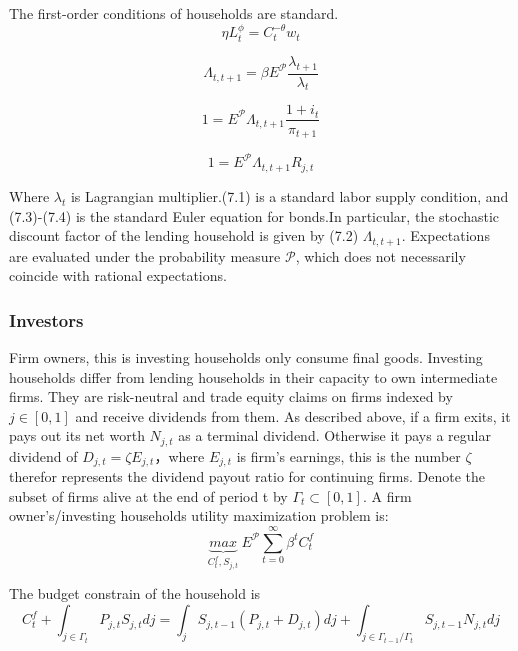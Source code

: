 \documentclass[10pt,math=newtx,citestyle=gb7714-2015,bibstyle=gb7714-2015]{elegantbook}
\begin{document}
{{{	
	The first-order conditions of households are standard. 
	\begin{equation}
		\eta L_t^{\phi}=C_t^{-\theta}w_t
	\end{equation}
	
	\begin{equation}
		\Lambda_{t,t+1}=\beta\mathit{E}^{\mathcal{P}}\frac{\lambda_{t+1}}{\lambda_t}
	\end{equation}
	
	\begin{equation}
		1=\mathit{E}^{\mathcal{P}}\Lambda_{t,t+1}\frac{1+i_t}{\pi_{t+1}}
	\end{equation}
	
	\begin{equation}
		1=\mathit{E}^{\mathcal{P}}\Lambda_{t,t+1}R_{j,t}
	\end{equation}
	
	Where $\lambda_t$ is Lagrangian multiplier.(7.1) is a standard labor supply condition, and (7.3)-(7.4) is the standard Euler equation for bonds.In particular, the stochastic discount factor of the lending household is given by (7.2) $\Lambda_{t,t+1}$. Expectations are evaluated under the probability measure $\mathcal{P}$, which does not necessarily coincide with rational expectations.
	
	\subsubsection{Investors}
	Firm owners, this is investing households only consume final goods. Investing households differ from lending households in their capacity to own intermediate firms. They are risk-neutral and trade equity claims on firms indexed by $j \in [0, 1]$ and receive dividends from them. As described above, if a firm exits, it pays out its net worth $N_{j,t}$ as a terminal dividend. Otherwise it pays a regular dividend of $D_{j,t}=\zeta E_{j,t}$，where $E_{j,t}$ is firm's earnings, this is the number $\zeta$ therefor represents the dividend payout ratio for continuing firms. Denote the subset of firms alive at the end of period t by $\varGamma_t \subset [0, 1]$. A firm owner’s/investing households utility maximization problem is:
	\begin{equation*}
		\underbrace{max}_{C_t^f,S_{j,t}}~\mathit{E}^{\mathcal{P}} \sum_{t=0}^{\infty}\beta^tC_{t}^f
	\end{equation*}
	
	The budget constrain of the household is
	\begin{equation*}
		C_t^f+\int_{j \in \varGamma_t} P_{j,t}S_{j,t}dj=\int_jS_{j,t-1}(P_{j,t}+D_{j,t})dj+\int_{j \in \varGamma_{t-1}/\varGamma_t} S_{j,t-1}N_{j,t}dj
	\end{equation*}
	
}}}
\end{document}
